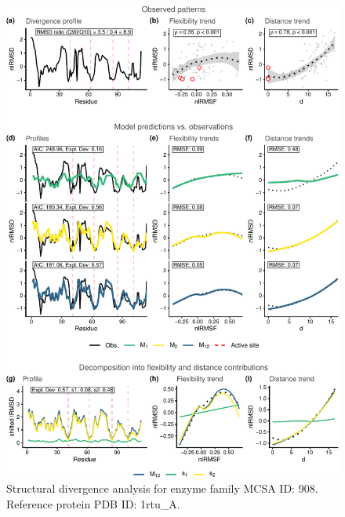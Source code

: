 \documentclass[
]{article}
\begin{document}
\clearpage
\begin{figure}[H]
\centering


\begin{center}\includegraphics{supplementary_material_files/figure-latex/generate_figures-32} \end{center}

\caption{Structural divergence analysis for enzyme family MCSA ID: 908. Reference protein PDB ID: 1rtu\_A.}
\end{figure}
\end{document}
